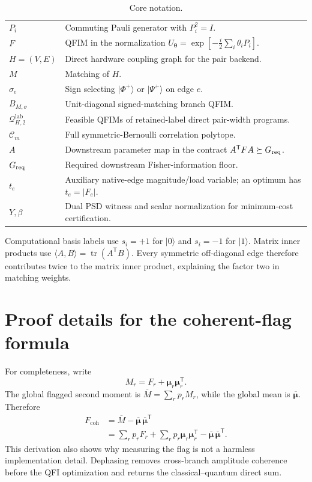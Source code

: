 \documentclass[11pt]{article}
\theoremstyle{definition}
\theoremstyle{remark}
\newcommand{\Q}{\mathcal{Q}}
\newcommand{\tr}{\operatorname{tr}}
\newcommand{\coh}{\mathrm{coh}}
\newcommand{\lab}{\mathrm{lab}}
\newcommand{\ket}[1]{\lvert #1\rangle}
\begin{document}
\begin{table}[H]
\centering
\caption{Core notation.}
\begin{tabularx}{\textwidth}{p{}X}
\toprule
$P_i$ & Commuting Pauli generator with $P_i^2=I$.\\
$F$ & QFIM in the normalization $U_{\bm\theta}=\exp[-\tfrac i2\sum_i\theta_iP_i]$.\\
$H=(V,E)$ & Direct hardware coupling graph for the pair backend.\\
$M$ & Matching of $H$.\\
$\sigma_e$ & Sign selecting $\ket{\Phi^+}$ or $\ket{\Psi^+}$ on edge $e$.\\
$B_{M,\sigma}$ & Unit-diagonal signed-matching branch QFIM.\\
$\Q^{\lab}_{H,2}$ & Feasible QFIMs of retained-label direct pair-width programs.\\
$\mathcal C_m$ & Full symmetric-Bernoulli correlation polytope.\\
$A$ & Downstream parameter map in the contract $A^{\mathsf T}FA\succeq G_{\rm req}$.\\
$G_{\rm req}$ & Required downstream Fisher-information floor.\\
$t_e$ & Auxiliary native-edge magnitude/load variable; an optimum has $t_e=|F_e|$.\\
$Y,\beta$ & Dual PSD witness and scalar normalization for minimum-cost certification.\\
\bottomrule
\end{tabularx}
\end{table}

Computational basis labels use $s_i=+1$ for $\ket0$ and $s_i=-1$ for $\ket1$. Matrix inner products use $\langle A,B\rangle=\tr(A^{\mathsf T}B)$. Every symmetric off-diagonal edge therefore contributes twice to the matrix inner product, explaining the factor two in matching weights.

\section{Proof details for the coherent-flag formula}

For completeness, write
\begin{equation}
  M_r=F_r+\bm\mu_r\bm\mu_r^{\mathsf T}.
\end{equation}
The global flagged second moment is $\overline M=\sum_rp_rM_r$, while the global mean is $\overline{\bm\mu}$. Therefore
\begin{align}
  F_{\coh}
  &=\overline M-\overline{\bm\mu}\,\overline{\bm\mu}^{\mathsf T}\\
  &=\sum_rp_rF_r+
  \sum_rp_r\bm\mu_r\bm\mu_r^{\mathsf T}
  -\overline{\bm\mu}\,\overline{\bm\mu}^{\mathsf T}.
\end{align}
This derivation also shows why measuring the flag is not a harmless implementation detail. Dephasing removes cross-branch amplitude coherence before the QFI optimization and returns the classical--quantum direct sum.
\end{document}
